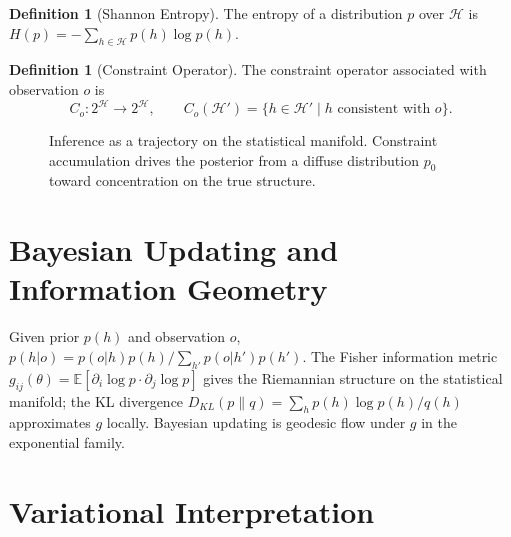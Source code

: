 \documentclass[12pt,a4paper,oneside]{book}
\numberwithin{equation}{chapter}
\theoremstyle{plain}
\theoremstyle{definition}
\newtheorem{definition}[theorem]{Definition}
\theoremstyle{remark}
\begin{document}
\begin{definition}[Shannon Entropy]
The entropy of a distribution $p$ over $\mathcal{H}$ is
$H(p) = -\sum_{h \in \mathcal{H}} p(h)\log p(h)$.
\end{definition}

\begin{definition}[Constraint Operator]
The constraint operator associated with observation $o$ is
\[
C_o : 2^{\mathcal{H}} \rightarrow 2^{\mathcal{H}}, \qquad
C_o(\mathcal{H}') = \{ h \in \mathcal{H}' \mid h \text{ consistent
with } o \}.
\]
\end{definition}

\begin{figure}[htbp]
\centering
{}
\caption{Inference as a trajectory on the statistical manifold.
Constraint accumulation drives the posterior from a diffuse
distribution $p_0$ toward concentration on the true structure.}
\label{fig:information-geometric-descent}
\end{figure}

\section{Bayesian Updating and Information Geometry}

Given prior $p(h)$ and observation $o$,
$p(h|o) = p(o|h)p(h)/\sum_{h'} p(o|h')p(h')$.
The Fisher information metric $g_{ij}(\theta) =
\mathbb{E}[\partial_i\log p \cdot \partial_j \log p]$ gives the
Riemannian structure on the statistical manifold; the KL divergence
$D_{KL}(p\|q) = \sum_h p(h)\log p(h)/q(h)$ approximates $g$
locally. Bayesian updating is geodesic flow under $g$ in the
exponential family.

\section{Variational Interpretation}
\end{document}
